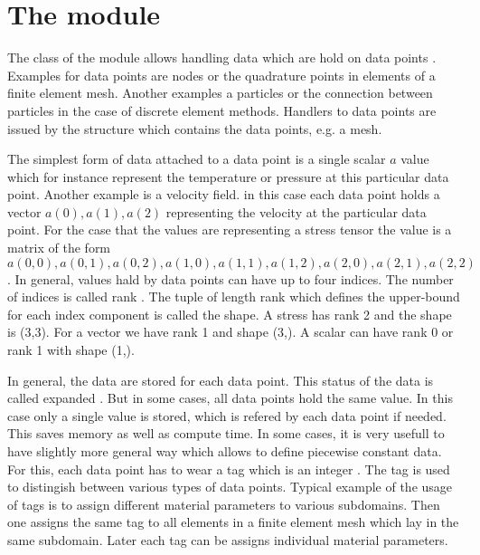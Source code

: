
\chapter{The module \escript}

 

The class \Data of the module \escript allows handling
data which are hold on data points . Examples for
data points are nodes or the quadrature points in elements of a finite
element mesh. Another examples a particles or the connection between
particles in the case of discrete element methods.  Handlers to data
points are issued by the structure which contains the data points,
e.g. a \finley mesh.

The simplest form of data attached to a data point is a single scalar
$a$ value which for instance represent the temperature or pressure at
this particular data point. Another example is a velocity field. in
this case each data point holds a vector $a(0),a(1),a(2)$ representing
the velocity at the particular data point. For the case that the
values are representing a stress tensor the value is a matrix of the
form
$a(0,0),a(0,1),a(0,2),a(1,0),a(1,1),a(1,2),a(2,0),a(2,1),a(2,2)$. In
general, values hald by data points can have up to four indices. The
number of indices is called rank . The tuple of length
rank which defines the upper-bound for each index component is called
the shape. A stress has rank 2 and the shape is (3,3). For a vector we
have rank 1 and shape (3,). A scalar can have rank 0 or rank 1 with
shape (1,).

In general, the data are stored for each data point. This status of
the data is called expanded . But in some cases, all
data points hold the same value. In this case only a single value is
stored, which is refered by each data point if needed. This saves
memory as well as compute time. In some cases, it is very usefull to
have slightly more general way which allows to define piecewise
constant data. For this, each data point has to wear a tag which is an
integer . The tag is used to distingish between various
types of data points. Typical example of the usage of tags is to
assign different material parameters to various subdomains. Then one
assigns the same tag to all elements in a finite element mesh which
lay in the same subdomain.  Later each tag can be assigns individual
material parameters.

